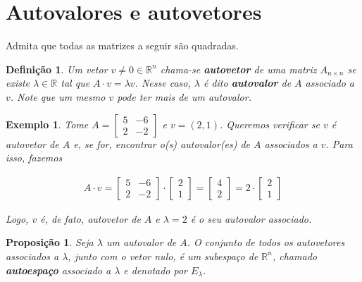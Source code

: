 \documentclass{article}
\newtheorem*{definition}{Definição}
\newtheorem*{example}{Exemplo}
\newtheorem*{proposition}{Proposição}
\begin{document}
\section{Autovalores e autovetores}
\hspace{12pt} Admita que todas as matrizes a seguir são quadradas.

\begin{definition}
	Um vetor $v\neq0\in\mathbb{R}^n$ chama-se \textbf{autovetor} de uma matriz $A_{n\times n}$ se existe $\lambda\in\mathbb{R}$ tal que $A\cdot v = \lambda v$. Nesse caso, $\lambda$ é dito \textbf{autovalor} de $A$ associado a $v$. Note que um mesmo $v$ pode ter mais de um autovalor.  
\end{definition}

\begin{example}
	Tome $\displaystyle{A = \begin{bmatrix}
		5 & -6 \\
		2 & -2
		\end{bmatrix}}$ e $v = (2, 1)$. Queremos verificar se $v$ é autovetor de $A$ e, se for, encontrar o(s) autovalor(es) de $A$ associados a $v$. Para isso, fazemos
	
	\begin{align*}
	A\cdot v = \begin{bmatrix}
	5 & -6 \\
	2 & -2
	\end{bmatrix}\cdot\begin{bmatrix}
	2 \\
	1
	\end{bmatrix} = \begin{bmatrix}
	4\\
	2
	\end{bmatrix} = 2\cdot\begin{bmatrix}
	2\\
	1
	\end{bmatrix}
	\end{align*}
	
	\par\vspace{0.3cm} Logo, $v$ é, de fato, autovetor de $A$ e $\lambda = 2$ é o seu autovalor associado.
	
\end{example}

\begin{proposition}
	Seja $\lambda$ um autovalor de $A$. O conjunto de todos os autovetores associados a $\lambda$, junto com o vetor nulo, é um subespaço de $\mathbb{R}^n$, chamado \textbf{autoespaço} associado a $\lambda$ e denotado por $E_{\lambda}$.
\end{proposition}
\end{document}
